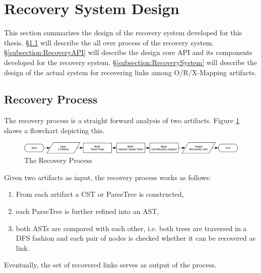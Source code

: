 \section{Recovery System Design}
\label{section:RecoverySystemDesign}
This section summarizes the design of the recovery system developed for this thesis.
§\ref{subsection:RecoveryProcess} will describe the all over process of the recovery system.
§\ref{subsection:RecoveryAPI} will describe the design core \gls{API} and its components developed for the recovery system.
§\ref{subsection:RecoverySystem} will describe the design of the actual system for recovering links among \gls{O/R/X-Mapping} artifacts.


\subsection{Recovery Process}
\label{subsection:RecoveryProcess}
The recovery process is a straight forward analysis of two artifacts.
Figure \ref{figure:RecovryProcess} shows a flowchart depicting this.
\begin{figure}[h!]
\begin{center}
\includegraphics[width=\textwidth]{images/RecoveryProcess.png}
\end{center}
\caption{The Recovery Process}
\label{figure:RecovryProcess}
\end{figure}
Given two artifacts as input, the recovery process works as follows:
\begin{enumerate}
\item
From each artifact a \gls{CST} or \gls{ParseTree} is constructed,
\item
each \gls{ParseTree} is further refined into an \gls{AST},
\item
both \glspl{AST} are compared with each other, i.e. both trees are traversed in a \gls{DFS} fashion and each pair of nodes is checked whether it can be recovered as link.
\end{enumerate}
Eventually, the set of recovered links serves as output of the process.

